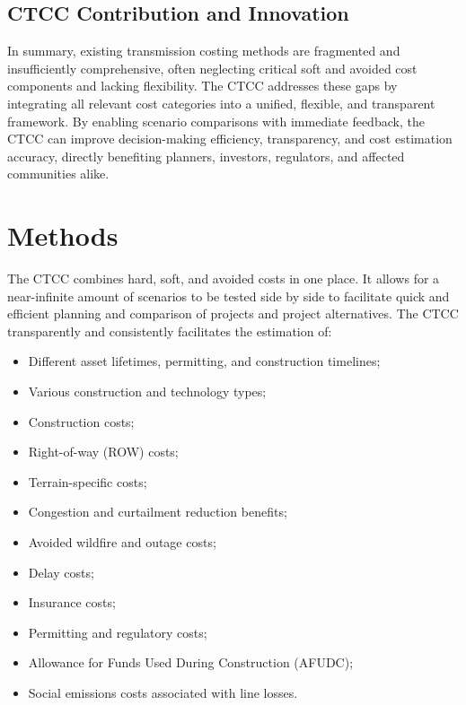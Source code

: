 \documentclass[11pt,twocolumn,a4paper]{article}
\begin{document}
\subsection{CTCC Contribution and Innovation}
In summary, existing transmission costing methods are fragmented and insufficiently comprehensive, often neglecting critical soft and avoided cost components and lacking flexibility. The CTCC addresses these gaps by integrating all relevant cost categories into a unified, flexible, and transparent framework. By enabling scenario comparisons with immediate feedback, the CTCC can improve decision-making efficiency, transparency, and cost estimation accuracy, directly benefiting planners, investors, regulators, and affected communities alike.








\section{Methods}


The CTCC combines hard, soft, and avoided costs in one place. It allows for a near-infinite amount of scenarios to be tested side by side to facilitate quick and efficient planning and comparison of projects and project alternatives. The CTCC transparently and consistently facilitates the estimation of:

\begin{itemize}
  \item Different asset lifetimes, permitting, and construction timelines;
  \item Various construction and technology types;
  \item Construction costs;
  \item Right-of-way (ROW) costs;
  \item Terrain-specific costs;
  \item Congestion and curtailment reduction benefits;
  \item Avoided wildfire and outage costs;
  \item Delay costs;
  \item Insurance costs;
  \item Permitting and regulatory costs;
  \item Allowance for Funds Used During Construction (AFUDC);
  \item Social emissions costs associated with line losses.
\end{itemize}
\end{document}
